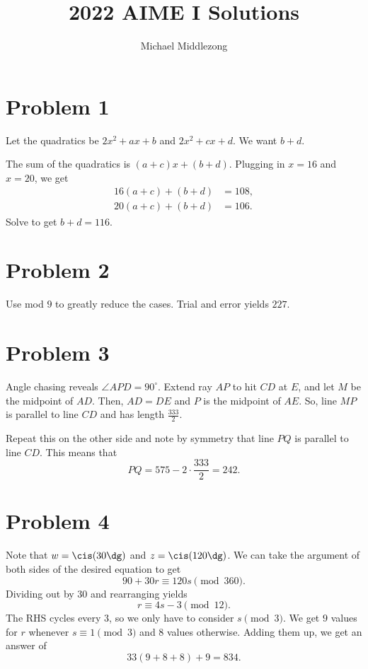 \documentclass{scrartcl}
\title{2022 AIME I Solutions}
\author{Michael Middlezong}
\begin{document}
\maketitle

\section*{Problem 1}
Let the quadratics be $2x^2 + ax + b$
and $2x^2 + cx + d$.
We want $b+d$.

The sum of the quadratics is $(a+c)x + (b+d)$.
Plugging in $x=16$ and $x=20$, we get
\begin{align*}
16(a+c) + (b+d) &= 108,\\
20(a+c) + (b+d) &= 106.
\end{align*}
Solve to get $b+d = \boxed{116}$.

\section*{Problem 2}
Use mod $9$ to greatly reduce the cases.
Trial and error yields $\boxed{227}$.

\section*{Problem 3}
Angle chasing reveals $\angle APD = 90^\circ$.
Extend ray $AP$ to hit $CD$ at $E$, and let $M$ be the midpoint of $AD$.
Then, $AD = DE$ and $P$ is the midpoint of $AE$.
So, line $MP$ is parallel to line $CD$ and has length $\frac{333}{2}$.

Repeat this on the other side and note by symmetry that line $PQ$ is parallel to line $CD$.
This means that
\[ PQ = 575 - 2 \cdot \frac{333}{2} = \boxed{242}. \]

\section*{Problem 4}
Note that $w = \cis(30\dg)$ and $z = \cis(120\dg)$.
We can take the argument of both sides of the desired equation to get
\[ 90 + 30r \equiv 120s \pmod{360}. \]
Dividing out by $30$ and rearranging yields
\[ r \equiv 4s - 3 \pmod{12}. \]
The RHS cycles every $3$, so we only have to consider $s \pmod{3}$.
We get $9$ values for $r$ whenever $s \equiv 1\pmod{3}$ and $8$ values otherwise.
Adding them up, we get an answer of
\[ 33(9+8+8) + 9 = \boxed{834}. \]
\end{document}

